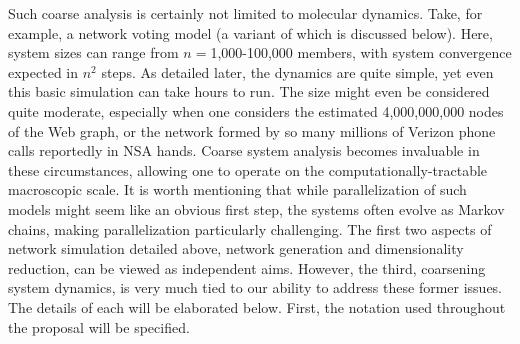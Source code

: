 \documentclass[11pt]{article}
\begin{document}
Such coarse analysis is certainly not limited to molecular dynamics. Take, for example, a network voting model (a variant of which is discussed below). Here, system sizes can range from $n=$1,000-100,000 members, with system convergence expected in $n^{2}$ steps. As detailed later, the dynamics are quite simple, yet even this basic simulation can take hours to run. The size might even be considered quite moderate, especially when one considers the estimated 4,000,000,000 nodes of the Web graph, or the network formed by so many millions of Verizon phone calls reportedly in NSA hands\cite{Guillaume2002}. Coarse system analysis becomes invaluable in these circumstances, allowing one to operate on the computationally-tractable macroscopic scale. It is worth mentioning that while parallelization of such models might seem like an obvious first step, the systems often evolve as Markov chains, making parallelization particularly challenging.
The first two aspects of network simulation detailed above, network generation and dimensionality reduction, can be viewed as independent aims. However, the third, coarsening system dynamics, is very much tied to our ability to address these former issues. The details of each will be elaborated below. First, the notation used throughout the proposal will be specified.
\end{document}
